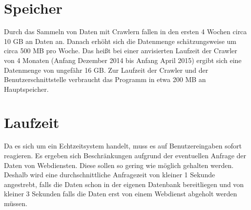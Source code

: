 \section{Speicher}
Durch das Sammeln von Daten mit Crawlern fallen in den ersten 4 Wochen circa 10 GB an Daten an. Danach erhöht sich die Datenmenge schätzungsweise um circa 500 MB pro Woche. Das heißt bei einer anvisierten Laufzeit der Crawler von 4 Monaten (Anfang Dezember 2014 bis Anfang April 2015) ergibt sich eine Datenmenge von ungefähr 16 GB.
Zur Laufzeit der Crawler und der Benutzerschnittstelle verbraucht das Programm in etwa 200 MB an Hauptspeicher.
\section{Laufzeit}
Da es sich um ein Echtzeitsystem handelt, muss es auf Benutzereingaben sofort reagieren. Es ergeben sich Beschränkungen aufgrund der eventuellen Anfrage der Daten von Webdiensten. Diese sollen so gering wie möglich gehalten werden. Deshalb wird eine durchschnittliche Anfragezeit von kleiner 1 Sekunde angestrebt, falls die Daten schon in der eigenen Datenbank bereitliegen und von kleiner 3 Sekunden falls die Daten erst von einem Webdienst abgeholt werden müssen.